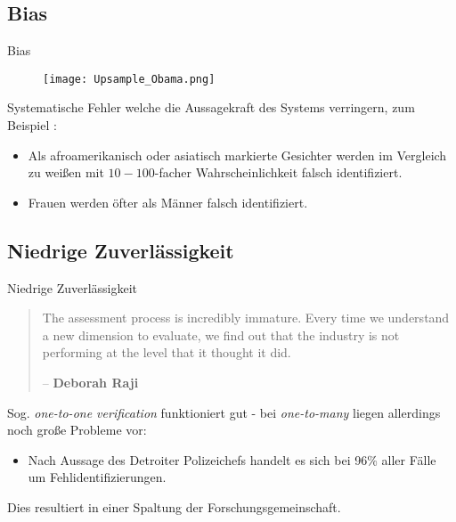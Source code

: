 \documentclass[10pt]{beamer}
\begin{document}
\subsection{Bias}
\begin{frame}{Bias}
  \begin{figure}
    \texttt{[image: Upsample\_Obama.png]}
  \end{figure}
  Systematische Fehler welche die Aussagekraft des Systems verringern, zum Beispiel \cite{NatureBias}:
  \begin{itemize}
    \item Als afroamerikanisch oder asiatisch markierte Gesichter werden im Vergleich zu weißen mit $10-100$-facher Wahrscheinlichkeit falsch identifiziert.
    \item Frauen werden öfter als Männer falsch identifiziert.
  \end{itemize}
\end{frame}

\subsection{Niedrige Zuverlässigkeit}
\begin{frame}{Niedrige Zuverlässigkeit}
  \begin{quote}
    The assessment process is incredibly immature. Every time we understand a new dimension to evaluate, we find out that the industry is not performing at the level that it thought it did. \\ \begin{center}
      -- \textbf{Deborah Raji} \cite{NatureBias}
    \end{center}
  \end{quote}

  Sog. \emph{one-to-one verification} funktioniert gut - bei \emph{one-to-many} liegen allerdings noch große Probleme vor:

  \pause
  \begin{itemize}
    \item Nach Aussage des Detroiter Polizeichefs handelt es sich bei 96\% aller Fälle um Fehlidentifizierungen. \cite{NatureBias}
  \end{itemize}

  \pause
  Dies resultiert in einer Spaltung der Forschungsgemeinschaft.
\end{frame}
\end{document}
